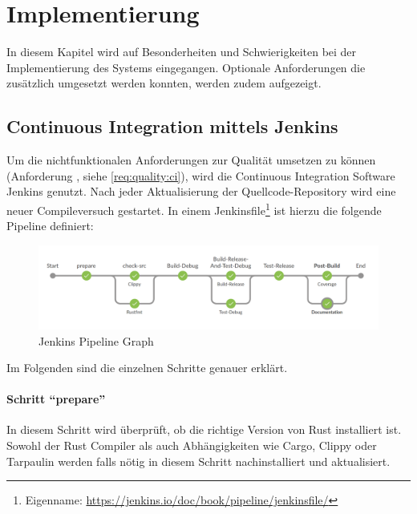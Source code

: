 
\chapter{Implementierung}

In diesem Kapitel wird auf Besonderheiten und Schwierigkeiten bei der Implementierung des Systems eingegangen.
Optionale Anforderungen die zusätzlich umgesetzt werden konnten, werden zudem aufgezeigt.



\section{Continuous Integration mittels Jenkins}

Um die nichtfunktionalen Anforderungen zur Qualität umsetzen zu können (Anforderung , siehe \autoref{req:quality:ci}), wird die Continuous Integration Software Jenkins genutzt.
Nach jeder Aktualisierung der Quellcode-Repository wird eine neuer Compileversuch gestartet.
In einem Jenkinsfile\footnote{Eigenname: \url{https://jenkins.io/doc/book/pipeline/jenkinsfile/}} ist hierzu die folgende Pipeline definiert:

\begin{figure}[H]
	\includegraphics[width=\textwidth]{images/jenkins_pipeline_graph.png}
	\caption{Jenkins Pipeline Graph}
	\label{impl:jenkins:pipeline:graph}
\end{figure}

Im Folgenden sind die einzelnen Schritte genauer erklärt.


\subsubsection{Schritt \enquote{prepare}}
In diesem Schritt wird überprüft, ob die richtige Version von Rust installiert ist.
Sowohl der Rust Compiler als auch Abhängigkeiten wie Cargo, Clippy oder Tarpaulin werden falls nötig  in diesem Schritt nachinstalliert und aktualisiert.

